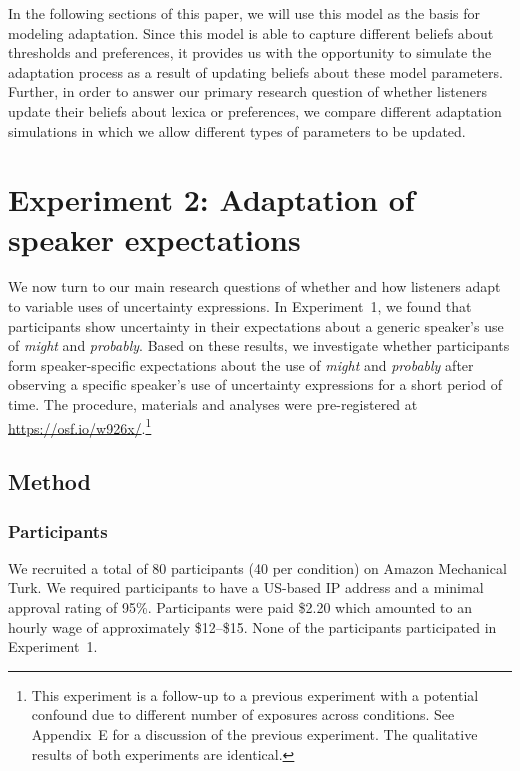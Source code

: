 \documentclass[man, floatsintext]{apa6}
\begin{document}
 In the following sections of this paper, we will use this model as the basis for modeling adaptation. Since this model
 is able to capture different beliefs about thresholds and preferences, it provides us with the opportunity to simulate 
 the adaptation process as a result of updating beliefs about these model parameters. Further, in order to answer
 our primary research question of whether listeners update their beliefs about lexica or preferences, we compare
 different adaptation simulations in which we allow different types of parameters to be updated.





\section{Experiment 2: Adaptation of speaker expectations}
\label{sec:exp-prod-adaptation}

We now turn to our main research questions of whether and how listeners adapt to variable uses of uncertainty expressions.
In Experiment~1, we found that participants show uncertainty in their expectations about a generic speaker's 
use of \textit{might} and \textit{probably}. Based on these results, we investigate whether participants
form speaker-specific expectations about the use of \textit{might} and \textit{probably} after observing a specific speaker's use of 
uncertainty expressions for a short period of time. The procedure, materials and analyses were pre-registered at \url{https://osf.io/w926x/}.\footnote{This experiment is a follow-up to a previous experiment with a potential confound due to different number of exposures across conditions. See Appendix~E for a discussion of the previous experiment. The qualitative results of both experiments are identical.}


\subsection{Method}

\subsubsection{Participants}
We recruited a total of 80 participants (40 per condition) on Amazon Mechanical Turk. 
We required participants to have a US-based IP address and a minimal approval rating 
of 95\%. Participants were paid \$2.20 which amounted to an hourly wage of approximately 
\$12--\$15. None of the participants participated in Experiment~1.
\end{document}

